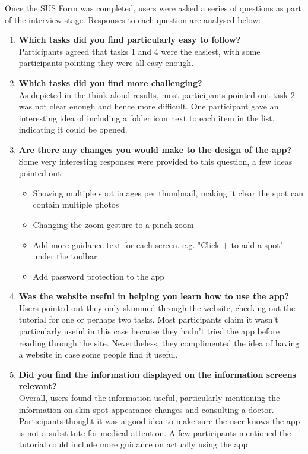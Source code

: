 Once the SUS Form was completed, users were asked a series of questions as part of the interview stage. Responses to each question are analysed below:
\begin{enumerate}
    \item \textbf{Which tasks did you find particularly easy to follow?}
    \\Participants agreed that tasks 1 and 4 were the easiest, with some participants pointing they were all easy enough.
    \item \textbf{Which tasks did you find more challenging?}
    \\As depicted in the think-aloud results, most participants pointed out task 2 was not clear enough and hence more difficult. One participant gave an interesting idea of including a folder icon next to each item in the list, indicating it could be opened.
    \item \textbf{Are there any changes you would make to the design of the app?}
    \\Some very interesting responses were provided to this question, a few ideas pointed out:
    \begin{itemize}
        \item Showing multiple spot images per thumbnail, making it clear the spot can contain multiple photos
        \item Changing the zoom gesture to a pinch zoom
        \item Add more guidance text for each screen. e.g. "Click + to add a spot" under the toolbar
        \item Add password protection to the app
    \end{itemize}
    \item \textbf{Was the website useful in helping you learn how to use the app?}
    \\ Users pointed out they only skimmed through the website, checking out the tutorial for one or perhaps two tasks. Most participants claim it wasn't particularly useful in this case because they hadn't tried the app before reading through the site. Nevertheless, they complimented the idea of having a website in case some people find it useful.
    \item \textbf{Did you find the information displayed on the information screens relevant?}
    \\ Overall, users found the information useful, particularly mentioning the information on skin spot appearance changes and consulting a doctor. Participants thought it was a good idea to make sure the user knows the app is not a substitute for medical attention. A few participants mentioned the tutorial could include more guidance on actually using the app.
\end{enumerate}